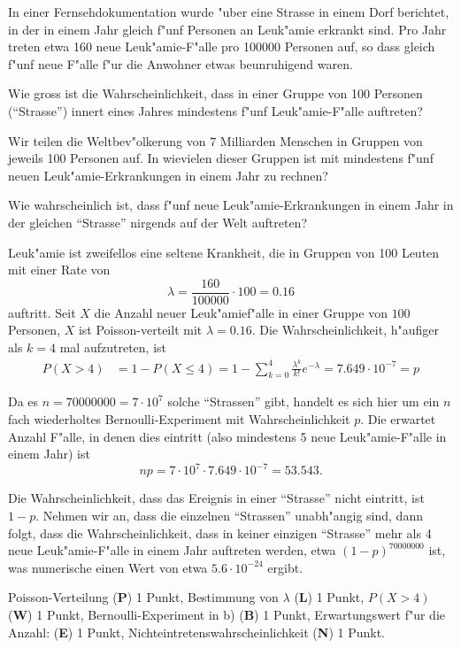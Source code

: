 In einer Fernsehdokumentation wurde "uber eine Strasse in einem Dorf berichtet,
in der in einem Jahr gleich f"unf Personen an Leuk"amie erkrankt sind.
Pro Jahr treten etwa 160 neue Leuk"amie-F"alle pro 100000 Personen auf,
so dass gleich f"unf neue F"alle f"ur die Anwohner etwas beunruhigend
waren.
\begin{teilaufgaben}
\item
Wie gross ist die Wahrscheinlichkeit, dass in einer Gruppe von
100 Personen (``Strasse'') innert eines Jahres mindestens f"unf
Leuk"amie-F"alle auftreten?
\item
Wir teilen die Weltbev"olkerung von 7 Milliarden Menschen
in Gruppen von jeweils 100 Personen auf.
In wievielen dieser Gruppen ist mit mindestens f"unf neuen
Leuk"amie-Erkrankungen in einem Jahr zu rechnen?
\item
Wie wahrscheinlich ist, dass f"unf neue Leuk"amie-Erkrankungen in einem 
Jahr in der gleichen ``Strasse'' nirgends auf der Welt auftreten?
\end{teilaufgaben}

\begin{loesung}
\begin{teilaufgaben}
\item
Leuk"amie ist zweifellos eine seltene Krankheit, die in Gruppen von 
100 Leuten mit einer Rate von 
\[
\lambda = \frac{160}{100000}\cdot 100=0.16
\]
auftritt.
Seit $X$ die Anzahl neuer Leuk"amief"alle in einer Gruppe von $100$
Personen, $X$ ist Poisson-verteilt mit $\lambda=0.16$.
Die Wahrscheinlichkeit, h"aufiger als $k=4$ mal aufzutreten, ist
\begin{align*}
P(X>4)
&=
1-P(X\le 4)
=
1-\sum_{k=0}^4 \frac{\lambda^k}{k!}e^{-\lambda}
=
7.649\cdot10^{-7}=p
\end{align*}
\item
Da es $n=70000000=7\cdot 10^7$ solche ``Strassen'' gibt, handelt es sich hier um
ein $n$ fach wiederholtes Bernoulli-Experiment mit Wahrscheinlichkeit $p$.
Die erwartet Anzahl F"alle, in denen dies eintritt (also mindestens 5
neue Leuk"amie-F"alle in einem Jahr) ist
\[
np=7\cdot 10^7\cdot 7.649\cdot 10^{-7}=53.543.
\]
\item
Die Wahrscheinlichkeit, dass das Ereignis in einer ``Strasse'' nicht eintritt,
ist $1-p$.
Nehmen wir an, dass die einzelnen ``Strassen'' unabh"angig sind, dann
folgt, dass die Wahrscheinlichkeit, dass in keiner einzigen ``Strasse''
mehr als 4 neue Leuk"amie-F"alle in einem Jahr auftreten werden, 
etwa $(1-p)^{70000000}$ ist, was numerische einen Wert von etwa
$5.6\cdot 10^{-24}$ ergibt.
\end{teilaufgaben}
\end{loesung}

\begin{bewertung}
Poisson-Verteilung ({\bf P}) 1 Punkt,
Bestimmung von $\lambda$ ({\bf L}) 1 Punkt,
$P(X>4)$ ({\bf W}) 1 Punkt,
Bernoulli-Experiment in b) ({\bf B}) 1 Punkt,
Erwartungswert f"ur die Anzahl: ({\bf E}) 1 Punkt,
Nichteintretenswahrscheinlichkeit ({\bf N}) 1 Punkt.
\end{bewertung}



